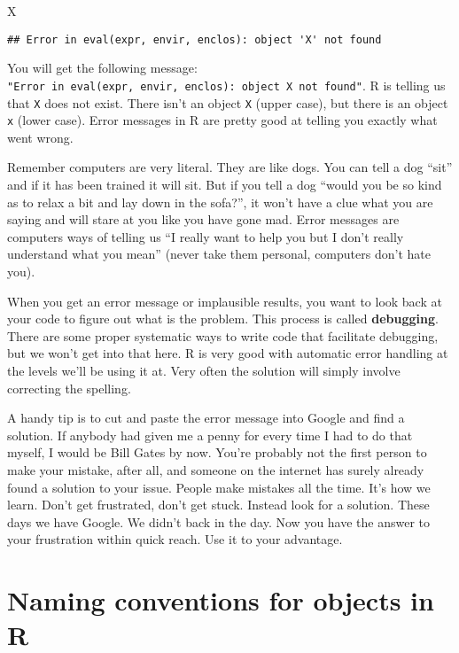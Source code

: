\documentclass[
]{book}
\newenvironment{Shaded}{\begin{snugshade}}{\end{snugshade}}
\newcommand{\NormalTok}[1]{#1}
\begin{document}
\begin{Shaded}
\begin{Highlighting}[]
\NormalTok{X}
\end{Highlighting}
\end{Shaded}

\begin{verbatim}
## Error in eval(expr, envir, enclos): object 'X' not found
\end{verbatim}

You will get the following message: \texttt{"Error\ in\ eval(expr,\ envir,\ enclos):\ object\ \textquotesingle{}X\textquotesingle{}\ not\ found"}. R is telling us that \texttt{X} does not exist. There isn't an object \texttt{X} (upper case), but there is an object \texttt{x} (lower case). Error messages in R are pretty good at telling you exactly what went wrong.

Remember computers are very literal. They are like dogs. You can tell a dog ``sit'' and if it has been trained it will sit. But if you tell a dog ``would you be so kind as to relax a bit and lay down in the sofa?'', it won't have a clue what you are saying and will stare at you like you have gone mad. Error messages are computers ways of telling us ``I really want to help you but I don't really understand what you mean'' (never take them personal, computers don't hate you).

When you get an error message or implausible results, you want to look back at your code to figure out what is the problem. This process is called \textbf{debugging}. There are some proper systematic ways to write code that facilitate debugging, but we won't get into that here. R is very good with automatic error handling at the levels we'll be using it at. Very often the solution will simply involve correcting the spelling.

A handy tip is to cut and paste the error message into Google and find a solution. If anybody had given me a penny for every time I had to do that myself, I would be Bill Gates by now. You're probably not the first person to make your mistake, after all, and someone on the internet has surely already found a solution to your issue. People make mistakes all the time. It's how we learn. Don't get frustrated, don't get stuck. Instead look for a solution. These days we have Google. We didn't back in the day. Now you have the answer to your frustration within quick reach. Use it to your advantage.

\section{Naming conventions for objects in R}\label{naming-conventions-for-objects-in-r}
\end{document}
